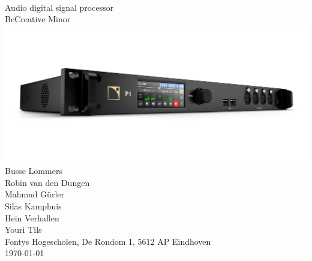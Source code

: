\documentclass[11pt, a4paper]{report}
\begin{document}
  

\pagestyle{empty}
\centering
\fontsize{2cm}{2cm}\selectfont{Module Design Document} \\
\vspace{2mm}
\fontsize{1cm}{1cm}\selectfont Audio digital signal processor \\
\vspace{2mm}
\large BeCreative Minor\\
\normalsize
\vspace{4cm}
\includegraphics[width=\linewidth]{3DR_P1_Perspective.png}\\
\vfill
\normalsize Busse Lommers \\
Robin van den Dungen \\
Mahmud Gürler \\
Silas Kamphuis \\
Hein Verhallen \\
Youri Tils \\
Fontys Hogescholen, De Rondom 1, 5612 AP Eindhoven \\
\today
\end{document}
